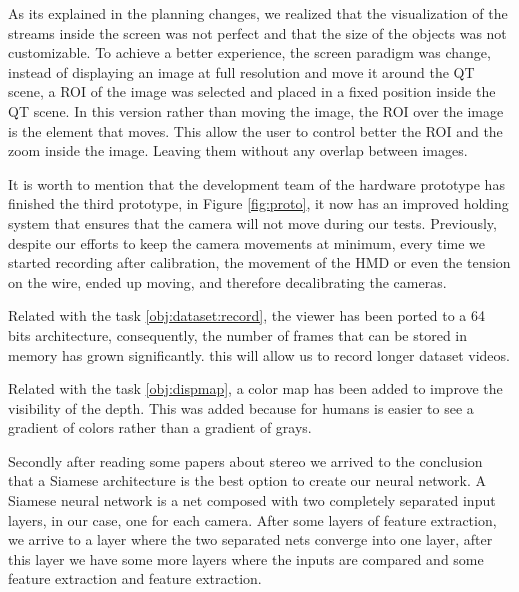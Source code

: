 \documentclass[10pt,a4paper,twocolumn,twoside]{article}
\begin{document}
	As its explained in the planning changes, we realized that the visualization of the streams inside the screen was not perfect and that the size of the objects was not customizable. To achieve a better experience, the screen paradigm was change, instead of displaying an image at full resolution and move it around the QT scene, a ROI of the image was selected and placed in a fixed position inside the QT scene. In this version rather than moving the image, the ROI over the image is the element that moves. This allow the user to control better the ROI and the zoom inside the image. Leaving them without any overlap between images.  

	It is worth to mention that the development team of the hardware prototype has finished the third prototype, in Figure \ref{fig:proto}, it now has an improved holding system that ensures that the camera will not move during our tests. Previously, despite our efforts to keep the camera movements at minimum, every time we started recording after calibration, the movement of the HMD or even the tension on the wire, ended up moving, and therefore decalibrating the cameras.   
	
	Related with the task \ref{obj:dataset:record}, the viewer has been ported to a 64 bits architecture, consequently, the number of frames that can be stored in memory has grown significantly. this will allow us to record longer dataset videos.
	
	Related with the task \ref{obj:dispmap}, a color map has been added to improve the visibility of the depth. This was added  because for humans is easier to see a gradient of colors rather than a gradient of grays.  
	
	Secondly after reading some papers about stereo we arrived to the conclusion that a Siamese architecture is the best option to create our neural network. A Siamese neural network is a net composed with two completely separated input layers, in our case, one for each camera. After some layers of feature extraction, we arrive to a layer where the two separated nets converge into one layer, after this layer we have some more layers where the inputs are compared and some feature extraction and feature extraction.
	
\end{document}
